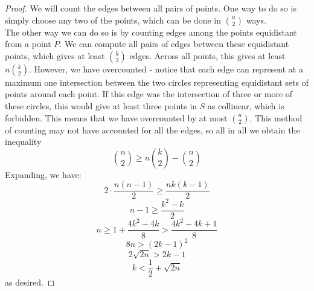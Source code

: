 \documentclass[11pt,twosided]{article}
\newcommand{\half}{\ensuremath{\frac{1}{2}}}
\begin{document}
\begin{proof}
We will count the edges between all pairs of points. One way to do so is simply choose any two of the points, which can be done in $\binom{n}{2}$ ways. \\
	The other way we can do so is by counting edges among the points equidistant from a point $P$. We can compute all pairs of edges between these equidistant points, which gives at least $\binom{k}{2}$ edges. Across all points, this gives at least $n\binom{k}{2}$. However, we have overcounted - notice that each edge can represent at a maximum one intersection between the two circles representing equidistant sets of points around each point. If this edge was the intersection of three or more of these circles, this would give at least three points in $S$ as collinear, which is forbidden. This means that we have overcounted by at most $\binom{n}{2}$. This method of counting may not have accounted for all the edges, so all in all we obtain the inequality 
\[
	\binom{n}{2} \geq n\binom{k}{2} - \binom{n}{2}
\]
Expanding, we have: 
\[
	2\cdot \frac{n(n-1)}{2} \geq \frac{nk(k-1)}{2}
\] 
\[
	n - 1 \geq \frac{k^2 - k}{2}
\]
\[
	n \geq 1 + \frac{4k^2 - 4k}{8} > \frac{4k^2 - 4k + 1}{8}
\]	
\[
	8n > (2k-1)^2
\]
\[
	2\sqrt{2n} > 2k - 1
\]
\[
	k < \half + \sqrt{2n}
\]
as desired.
\end{proof}
\end{document}
